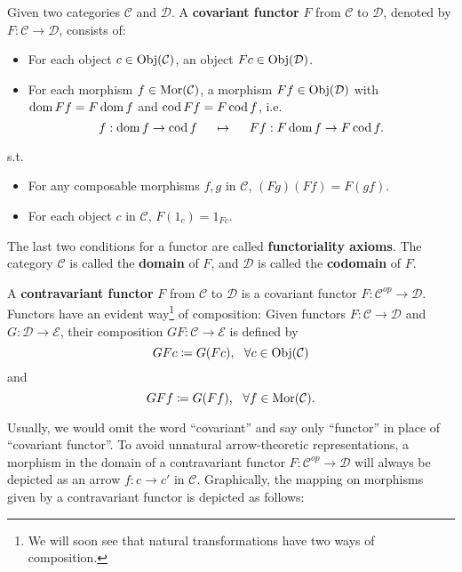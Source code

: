 	\begin{definition}
	Given two categories $\mathcal{C}$ and $\mathcal{D}$. A \textbf{covariant functor} $F$ from $\mathcal{C}$ to $\mathcal{D}$, denoted by $F:\mathcal{C}\to \mathcal{D}$, consists of:
	\begin{itemize}
		\item For each object $c\in \operatorname{Obj}(\mathcal{C})$, an object $Fc\in\operatorname{Obj}(\mathcal{D})$.
		\item For each morphism $f\in\operatorname{Mor}(\mathcal{C})$, a morphism $Ff\in\operatorname{Obj}(\mathcal{D})$ with $\operatorname{dom} Ff=F\operatorname{dom} f$ and $\operatorname{cod} Ff=F\operatorname{cod} f$, i.e.
		\[f:\operatorname{dom} f\to \operatorname{cod} f\ \ \ \ \mapsto\ \ \ \ Ff:F\operatorname{dom} f\to F\operatorname{cod} f.\]
	\end{itemize}
	s.t. 
	\begin{itemize}
		\item For any composable morphisms $f,g$ in $\mathcal{C}$, $(Fg)(Ff)=F(gf)$.
		\item For each object $c$ in $\mathcal{C}$, $F(1_c)=1_{Fc}$.
	\end{itemize}
	The last two conditions for a functor are called \textbf{functoriality axioms}. The category $\mathcal{C}$ is called the \textbf{domain} of $F$, and $\mathcal{D}$ is called the \textbf{codomain} of $F$.
	\end{definition}
	\begin{definition}
	A \textbf{contravariant functor} $F$ from $\mathcal{C}$ to $\mathcal{D}$ is a covariant functor $F:\mathcal{C}^{op}\to \mathcal{D}$. Functors have an evident way\footnote{We will soon see that natural transformations have two ways of composition.} of composition: Given functors $F:\mathcal{C}\to \mathcal{D}$ and $G:\mathcal{D}\to \mathcal{E}$, their composition $GF:\mathcal{C}\to \mathcal{E}$ is defined by
	\[GFc\coloneqq G(Fc),\ \ \forall c\in\Obj(\mathcal{C})\]
	and
	\[GFf\coloneqq G(Ff),\ \ \forall f\in\operatorname{Mor}(\mathcal{C}).\]
	\end{definition}
	Usually, we would omit the word ``covariant'' and say only ``functor'' in place of ``covariant functor''. To avoid unnatural arrow-theoretic representations, a morphism in the domain of a contravariant functor $F:\mathcal{C}^{op}\to \mathcal{D}$ will always be depicted as an arrow $f:c\to c'$ in $\mathcal{C}$. Graphically, the mapping on morphisms given by a contravariant functor is depicted as follows:
	\begin{center}
	\end{center}

